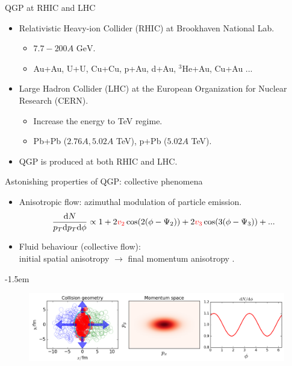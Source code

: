 \documentclass[11pt]{beamer}
\begin{document}
\begin{frame}{QGP at RHIC and LHC}
\begin{itemize}
\item Relativistic Heavy-ion Collider (RHIC) at Brookhaven National Lab.
	\begin{itemize}
	\item $7.7 - 200 A \textrm{ GeV}$.
	\item Au+Au, U+U, Cu+Cu, p+Au, d+Au, ${}^3$He+Au, Cu+Au ...
	\end{itemize}
\item Large Hadron Collider (LHC) at the European Organization for Nuclear Research (CERN).
	\begin{itemize}
	\item Increase the energy to TeV regime.
	\item Pb+Pb ($2.76 A, 5.02 A$ TeV), p+Pb ($5.02 A$ TeV).
	\end{itemize}
\item QGP is produced at both RHIC and LHC.
\end{itemize}
\end{frame}

\begin{frame}{Astonishing properties of QGP: collective phenomena}
\begin{itemize} 
\item Anisotropic flow: azimuthal modulation of particle emission.
\begin{eqnarray}
\nonumber
\frac{\mathrm{d}N}{p_T\mathrm{d}p_T\mathrm{d}\phi} \propto 1 + 2{\color{red} v_2} \cos(2(\phi-\Psi_2)) + 2{\color{red}v_3} \cos(3(\phi-\Psi_3)) + ...
\end{eqnarray}
\item Fluid behaviour (collective flow): \\initial spatial anisotropy $\rightarrow$ final momentum anisotropy .
\end{itemize}
\kern-1.5em
\begin{center}
\begin{figure}
\includegraphics[width=\textwidth]{./pics/nuclei-less.png}
\end{figure}
\end{center}
\end{frame}
\end{document}
